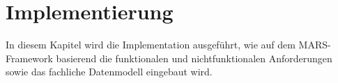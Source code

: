 %


\chapter{Implementierung}\label{ch:implementierung}

In diesem Kapitel wird die Implementation ausgeführt, wie auf dem MARS-Framework basierend die funktionalen und nichtfunktionalen Anforderungen sowie das fachliche Datenmodell eingebaut wird.




